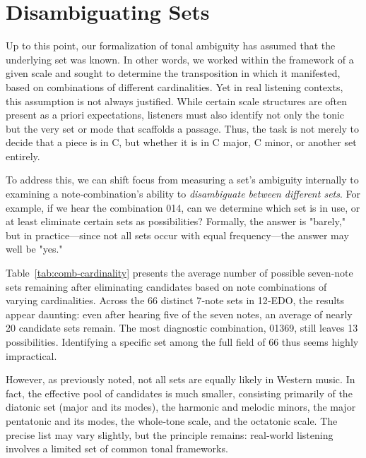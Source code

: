 \documentclass[10pt,twocolumn]{article}
\numberwithin{equation}{section} %
\begin{document}
    \section{Disambiguating Sets}

    Up to this point, our formalization of tonal ambiguity has assumed that the underlying set was known.
    In other words, we worked within the framework of a given scale and sought to determine the transposition in which it manifested, based on combinations of different cardinalities.
    Yet in real listening contexts, this assumption is not always justified.
    While certain scale structures are often present as a priori expectations\citep{Krumhansl1979}, listeners must also identify not only the tonic but the very set or mode that scaffolds a passage.
    Thus, the task is not merely to decide that a piece is in C, but whether it is in C major, C minor, or another set entirely.

    To address this, we can shift focus from measuring a set's ambiguity internally to examining a note‑combination's ability to \textit{disambiguate between different sets}.
    For example, if we hear the combination 014, can we determine which set is in use, or at least eliminate certain sets as possibilities?
    Formally, the answer is "barely," but in practice—since not all sets occur with equal frequency—the answer may well be "yes."

    Table~\ref{tab:comb-cardinality} presents the average number of possible seven‑note sets remaining after eliminating candidates based on note combinations of varying cardinalities.
    Across the 66 distinct 7‑note sets in 12‑EDO, the results appear daunting: even after hearing five of the seven notes, an average of nearly 20 candidate sets remain.
    The most diagnostic combination, 01369, still leaves 13 possibilities.
    Identifying a specific set among the full field of 66 thus seems highly impractical.

    

    However, as previously noted, not all sets are equally likely in Western music.
    In fact, the effective pool of candidates is much smaller, consisting primarily of the diatonic set (major and its modes), the harmonic and melodic minors, the major pentatonic and its modes, the whole‑tone scale, and the octatonic scale.
    The precise list may vary slightly, but the principle remains: real‑world listening involves a limited set of common tonal frameworks.
\end{document}
